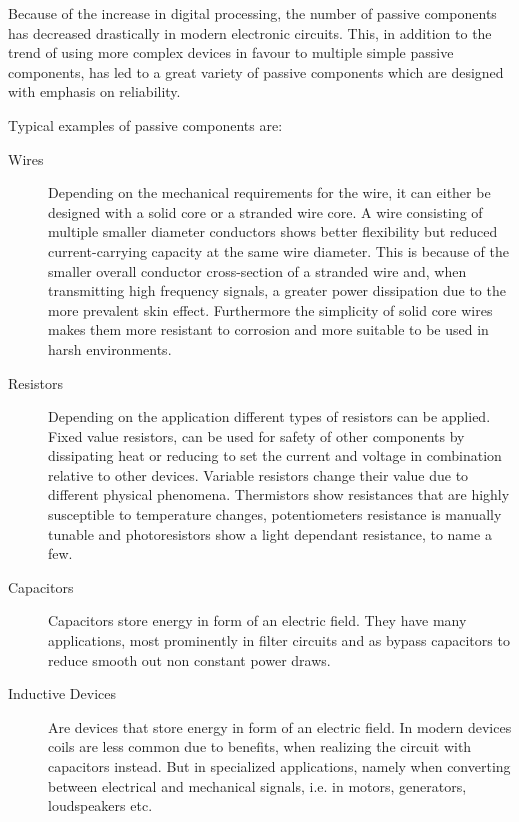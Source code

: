 Because of the increase in digital processing, the number of passive components has decreased drastically in modern electronic circuits. This, in addition to the trend of using more complex devices in favour to multiple simple passive components, has led to a great variety of passive components which are designed with emphasis on reliability.

Typical examples of passive components are:
\begin{description}
    \item[Wires] Depending on the mechanical requirements for the wire, it can either be designed with a solid core or a stranded wire core. A wire consisting of multiple smaller diameter conductors shows better flexibility but reduced current-carrying capacity at the same wire diameter. This is because of the smaller overall conductor cross-section of a stranded wire and, when transmitting high frequency signals, a greater power dissipation due to the more prevalent skin effect. Furthermore the simplicity of solid core wires makes them more resistant to corrosion and more suitable to be used in harsh environments.
    \item[Resistors] Depending on the application different types of resistors can be applied. Fixed value resistors, can be used for safety of other components by dissipating heat or reducing to set the current and voltage in combination relative to other devices. Variable resistors change their value due to different physical phenomena. Thermistors show resistances that are highly susceptible to temperature changes, potentiometers resistance is manually tunable and photoresistors show a light dependant resistance, to name a few. 
    \item[Capacitors] Capacitors store energy in form of an electric field. They have many applications, most prominently in filter circuits and as bypass capacitors to reduce smooth out non constant power draws.
    \item[Inductive Devices] Are devices that store energy in form of an electric field. In modern devices coils are less common due to benefits, when realizing the circuit with capacitors instead. But in specialized applications, namely when converting between electrical and mechanical signals, i.e. in motors, generators, loudspeakers etc.
\end{description}

